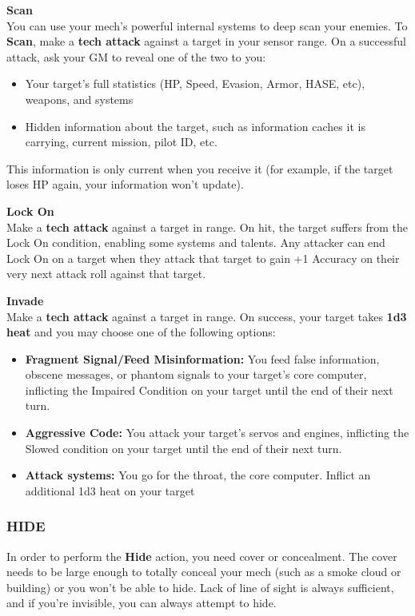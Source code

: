 \textbf{Scan}\\
You can use your mech’s powerful internal systems to deep scan your enemies.
To \textbf{Scan}, make a \textbf{tech attack} against a target in your sensor range. On a successful attack, ask your GM to reveal one of the two to you:
\begin{itemize}
    \item Your target’s full statistics (HP, Speed, Evasion, Armor, HASE, etc), weapons, and systems
    \item Hidden information about the target, such as information caches it is carrying, current mission, pilot ID, etc. 
\end{itemize}
This information is only current when you receive it (for example, if the target loses HP again, your information won’t update).

\textbf{Lock On}\\
Make a \textbf{tech attack} against a target in range. On hit, the target suffers from the Lock On condition, enabling some systems and talents. Any attacker can end Lock On on a target when they attack that target to gain +1 Accuracy on their very next attack roll against that target.

\textbf{Invade}\\
Make a \textbf{tech attack} against a target in range. On success, your target takes \textbf{1d3 heat} and you may choose one of the following options:
\begin{itemize}
\item \textbf{Fragment Signal/Feed Misinformation:} You feed false information, obscene messages, or phantom signals to your target’s core computer, inflicting the Impaired Condition on your target until the end of their next turn.
\item \textbf{Aggressive Code:} You attack your target’s servos and engines, inflicting the Slowed condition on your target until the end of their next turn.
\item \textbf{Attack systems:} You go for the throat, the core computer. Inflict an additional 1d3 heat on your target
\end{itemize}


\subsubsection{HIDE}

In order to perform the \textbf{Hide} action, you need cover or concealment. The cover needs to be large enough to totally conceal your mech (such as a smoke cloud or building) or you won’t be able to hide. Lack of line of sight is always sufficient, and if you’re invisible, you can always attempt to hide.

